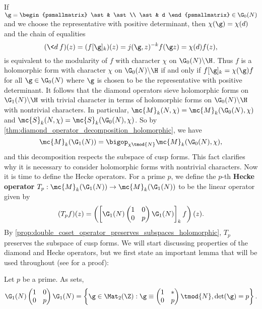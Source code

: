    If $\g = \begin{psmallmatrix} \ast & \ast \\ \ast & d \end{psmallmatrix} \in \G_{0}(N)$ and we choose the representative with positive determinant, then $\chi(\g) = \chi(d)$ and the chain of equalities
    \[
      (\<d\>f)(z) = (f[\g]_{k})(z) = j(\g,z)^{-k}f(\g z) = \chi(d)f(z),
    \]
    is equivalent to the modularity of $f$ with character $\chi$ on $\G_{0}(N)\backslash\H$. Thus $f$ is a holomorphic form with character $\chi$ on $\G_{0}(N)\backslash\H$ if and only if $f[\g]_{k} = \chi(\g)f$ for all $\g \in \G_{0}(N)$ where $\g$ is chosen to be the representative with positive determinant. It follows that the diamond operators sieve holomorphic forms on $\G_{1}(N)\backslash\H$ with trivial character in terms of holomorphic forms on $\G_{0}(N)\backslash\H$ with nontrivial characters. In particular, $\mc{M}_{k}(N,\chi) = \mc{M}_{k}(\G_{0}(N),\chi)$ and $\mc{S}_{k}(N,\chi) = \mc{S}_{k}(\G_{0}(N),\chi)$. So by \cref{thm:diamond_operator_decomposition_holomorphic}, we have
    \[
      \mc{M}_{k}(\G_{1}(N)) = \bigop_{\chi \tmod{N}}\mc{M}_{k}(\G_{0}(N),\chi),
    \]
    and this decomposition respects the subspace of cusp forms. This fact clarifies why it is necessary to consider holomorphic forms with nontrivial characters. Now it is time to define the Hecke operators. For a prime $p$, we define the $p$-th \textbf{Hecke operator} $T_{p}:\mc{M}_{k}(\G_{1}(N)) \to \mc{M}_{k}(\G_{1}(N))$ to be the linear operator given by
    \[
      (T_{p}f)(z) = \left(\left[\G_{1}(N)\begin{pmatrix} 1 & 0 \\ 0 & p \end{pmatrix}\G_{1}(N)\right]_{k}f\right)(z).
    \]
    By \cref{prop:double_coset_operator_preserves_subspaces_holomorphic}, $T_{p}$ preserves the subspace of cusp forms. We will start discussing properties of the diamond and Hecke operators, but we first state an important lemma that will be used throughout (see \cite{diamond2005first} for a proof):

    \begin{lemma}\label{lem:cosets_for_Hecke_operators}
      Let $p$ be a prime. As sets,
      \[
        \G_{1}(N)\begin{pmatrix} 1 & 0 \\ 0 & p \end{pmatrix}\G_{1}(N) = \left\{\g \in \Mat_{2}(\Z):\g \equiv \begin{pmatrix} 1 & \ast \\ 0 & p \end{pmatrix} \tmod{N}, \det(\g) = p\right\}.
      \]
    \end{lemma}
    
